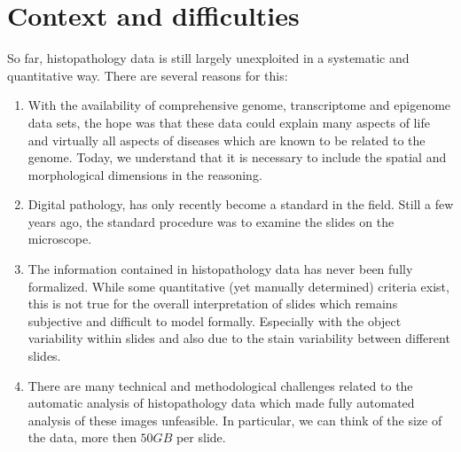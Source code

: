 \documentclass[a4paper,10pt]{article}
\begin{document}
\section{Context and difficulties}

So far, histopathology data is still largely unexploited in a systematic and
quantitative way. There are several reasons for this: 

\begin{enumerate}
\item With the
availability of comprehensive genome, transcriptome and epigenome data
sets, the hope was that these data could explain many aspects of life
and virtually all aspects of diseases which are known to be related to
the genome. Today, we understand that it is necessary to include the spatial and
morphological dimensions in the reasoning. 
\item Digital pathology,
has only recently become a standard in the field. Still a few years
ago, the standard
procedure was to examine the slides on the
microscope. 
\item The information
contained in histopathology data has never been fully
formalized. While some quantitative (yet manually determined) criteria
exist, this is not true for the overall interpretation of slides
which remains subjective and difficult to model formally. Especially with the object variability within slides and also due to the stain variability between different slides.
\item There are many technical and methodological challenges related
  to the automatic analysis of histopathology data which made fully
  automated analysis of these images unfeasible. In particular, we can think of the size of the data, more then $50GB$ per slide. 
\end{enumerate}
\end{document}
